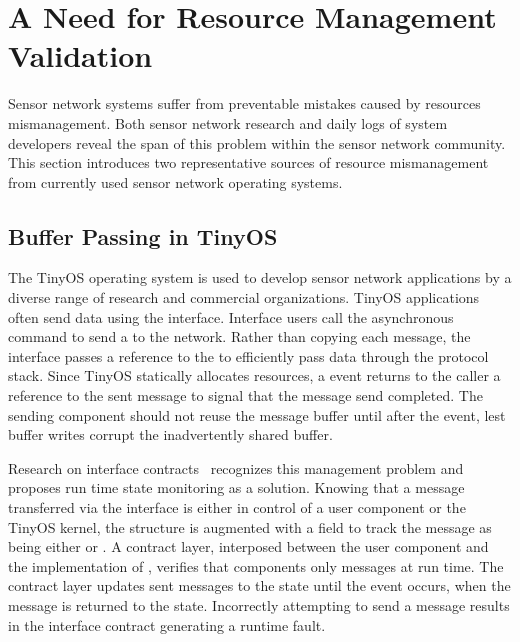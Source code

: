 \section{A Need for Resource Management Validation}
\label{sec:mot}

Sensor network systems suffer from preventable mistakes caused by resources
mismanagement.
%
Both sensor network research and daily logs of system developers reveal the
span of this problem within the sensor network community.
%
This section introduces two representative sources of resource mismanagement
from currently used sensor network operating systems.



\subsection{Buffer Passing in TinyOS}
\label{ssec:tinyos}


The TinyOS operating system is used to develop sensor network applications by
a diverse range of research and commercial organizations.
%
TinyOS applications often send data using the  interface.
%
Interface users call the asynchronous  command to send a
 to the network.
%
Rather than copying each message, the  interface passes a
reference to the  to efficiently pass data through the protocol
stack.
%
Since TinyOS statically allocates resources, a  event returns
to the caller a reference to the sent message to signal that the message send
completed.
%
The sending component should not reuse the message buffer until after the
 event, lest buffer writes corrupt the inadvertently shared
buffer.



Research on interface contracts~\cite{archer07interface} recognizes this
management problem and proposes run time state monitoring as a solution.
%
Knowing that a message transferred via the  interface is
either in control of a user component or the TinyOS kernel, the
 structure is augmented with a  field to
track the message as being either  or .
%
A contract layer, interposed between the user component and the
implementation of , verifies that components only 
 messages at run time.
%
The contract layer updates sent messages to the  state until
the  event occurs, when the message is returned to the
 state.
%
Incorrectly attempting to send a  message results in the
interface contract generating a runtime fault.




